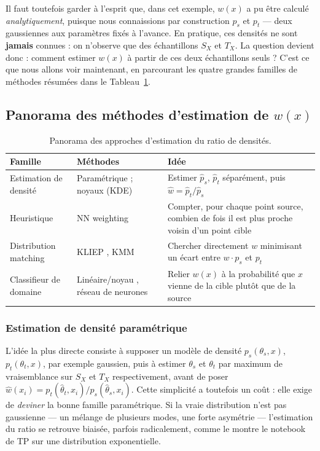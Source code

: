 \documentclass[11pt]{article}
\begin{document}
Il faut toutefois garder à l'esprit que, dans cet exemple, $w(x)$ a pu être calculé \emph{analytiquement},
puisque nous connaissions par construction $p_s$ et $p_t$ --- deux gaussiennes aux paramètres fixés à
l'avance. En pratique, ces densités ne sont \textbf{jamais} connues : on n'observe que des échantillons
$S_X$ et $T_X$. La question devient donc : comment estimer $w(x)$ à partir de ces deux échantillons
seuls ? C'est ce que nous allons voir maintenant, en parcourant les quatre grandes familles de méthodes
résumées dans le Tableau~\ref{tab:panorama}.

\subsection{Panorama des méthodes d'estimation de $w(x)$}

\begin{table}[h]
\centering
\small
\begin{tabular}{@{}p{3.6cm}p{4.2cm}p{5.7cm}@{}}
\toprule
\textbf{Famille} & \textbf{Méthodes} & \textbf{Idée} \\
\midrule
Estimation de densité & Paramétrique ; noyaux (KDE) & Estimer $\hat p_s$, $\hat p_t$ séparément, puis
$\hat w = \hat p_t/\hat p_s$ \\
Heuristique & NN weighting \citep{loog2012nearest} & Compter, pour chaque point source, combien de fois
il est plus proche voisin d'un point cible \\
Distribution matching & KLIEP \citep{sugiyama2007direct}, KMM \citep{huang2007correcting} & Chercher
directement $w$ minimisant un écart entre $w\cdot p_s$ et $p_t$ \\
Classifieur de domaine & Linéaire/noyau \citep{bickel2007discriminative}, réseau de neurones
\citep{zhang2018importance} & Relier $w(x)$ à la probabilité que $x$ vienne de la cible plutôt que de la
source \\
\bottomrule
\end{tabular}
\caption{Panorama des approches d'estimation du ratio de densités.}
\label{tab:panorama}
\end{table}

\subsubsection{Estimation de densité paramétrique}

L'idée la plus directe consiste à supposer un modèle de densité $p_s(\theta_s,x)$, $p_t(\theta_t,x)$, par
exemple gaussien, puis à estimer $\theta_s$ et $\theta_t$ par maximum de vraisemblance sur $S_X$ et $T_X$
respectivement, avant de poser $\widehat w(x_i) = p_t(\hat\theta_t,x_i)/p_s(\hat\theta_s,x_i)$. Cette
simplicité a toutefois un coût : elle exige de \emph{deviner} la bonne famille paramétrique. Si la vraie
distribution n'est pas gaussienne --- un mélange de plusieurs modes, une forte asymétrie --- l'estimation
du ratio se retrouve biaisée, parfois radicalement, comme le montre le notebook de TP sur une
distribution exponentielle.
\end{document}
